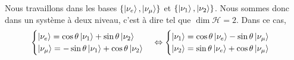 \documentclass[../notesdecours.tex]{subfiles}
\begin{document}
Nous travaillons dans les bases $\left\{\ket{\nu_e},\ket{\nu_\mu}\right\}$ et $\left\{\ket{\nu_1},\ket{\nu_2}\right\}$. Nous sommes donc dans un système à deux niveau, c'est à dire tel que $\dim\mathcal{H} = 2$. Dans ce cas,
\begin{equation}
    \begin{cases}
        \ket{\nu_e} = \cos\theta\ket{\nu_1}+\sin\theta\ket{\nu_2}\\
        \ket{\nu_\mu} = -\sin\theta\ket{\nu_1}+\cos\theta\ket{\nu_2}
    \end{cases}
    \Leftrightarrow
    \begin{cases}
        \ket{\nu_1} = \cos\theta\ket{\nu_e}-\sin\theta\ket{\nu_\mu}\\
        \ket{\nu_2} = \sin\theta\ket{\nu_e}+\cos\theta\ket{\nu_\mu}
    \end{cases}
\end{equation}
\end{document}
